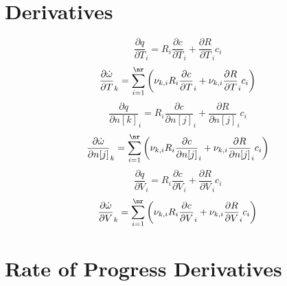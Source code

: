 \documentclass[a4paper,10pt]{article}
\begin{document}
\section{Derivatives}
\begin{dmath} \frac{\partial q }{\partial T }_{i} = R_{i} \frac{\partial c }{\partial T }_{i} + \frac{\partial R }{\partial T }_{i} c_{i}\end{dmath} 
\begin{dmath} \frac{\partial \dot{\omega} }{\partial T }_{k} = \sum_{i=1}^{\nr} \left(\nu_{k,i} R_{i} \frac{\partial c }{\partial T }_{i} + \nu_{k,i} \frac{\partial R }{\partial T }_{i} c_{i}\right)\end{dmath} 
\begin{dmath} \frac{\partial q }{\partial n[k] }_{i} = R_{i} \frac{\partial c }{\partial n[j] }_{i} + \frac{\partial R }{\partial n[j] }_{i} c_{i}\end{dmath} 
\begin{dmath} \frac{\partial \dot{\omega} }{\partial n[j] }_{k} = \sum_{i=1}^{\nr} \left(\nu_{k,i} R_{i} \frac{\partial c }{\partial n[j] }_{i} + \nu_{k,i} \frac{\partial R }{\partial n[j] }_{i} c_{i}\right)\end{dmath} 
\begin{dmath} \frac{\partial q }{\partial V }_{i} = R_{i} \frac{\partial c }{\partial V }_{i} + \frac{\partial R }{\partial V }_{i} c_{i}\end{dmath} 
\begin{dmath} \frac{\partial \dot{\omega} }{\partial V }_{k} = \sum_{i=1}^{\nr} \left(\nu_{k,i} R_{i} \frac{\partial c }{\partial V }_{i} + \nu_{k,i} \frac{\partial R }{\partial V }_{i} c_{i}\right)\end{dmath} 
\section{Rate of Progress Derivatives}
\end{document}
